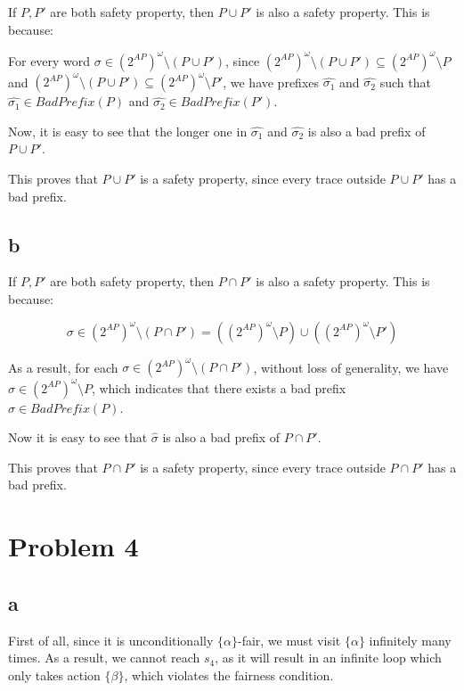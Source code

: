 If $P, P'$ are both safety property, then $P \cup P'$ is also a safety property.
This is because:

\newcommand{\bad}[1]{\textit{BadPrefix}(#1)}
\newcommand{\whole}{(2^{AP})^\omega}

For every word $\sigma \in \whole \setminus (P \cup P')$,
since $\whole \setminus (P \cup P') \subseteq \whole \setminus P$
and $\whole \setminus (P \cup P') \subseteq \whole \setminus P'$,
we have prefixes $\hat{\sigma_1}$ and $\hat{\sigma_2}$ such that
$\hat{\sigma_1} \in \bad{P}$ and $\hat{\sigma_2} \in \bad{P'}$.

Now, it is easy to see that the longer one in $\hat{\sigma_1}$ and
$\hat{\sigma_2}$ is also a bad prefix of $P \cup P'$.

This proves that $P \cup P'$ is a safety property,
since every trace outside $P \cup P'$ has a bad prefix.

\subsection{b}

If $P, P'$ are both safety property, then $P \cap P'$ is also a safety property.
This is because:

$$
\sigma \in \whole \setminus (P \cap P')
= (\whole \setminus P) \cup (\whole \setminus P')
$$

As a result, for each $\sigma \in \whole \setminus (P \cap P')$,
without loss of generality, we have $\sigma \in \whole \setminus P$,
which indicates that there exists a bad prefix $\hat{\sigma} \in \bad{P}$.

Now it is easy to see that $\hat{\sigma}$ is also a bad prefix of $P \cap P'$.

This proves that $P \cap P'$ is a safety property,
since every trace outside $P \cap P'$ has a bad prefix.

\section{Problem 4}

\subsection{a}

\newcommand{\aaa}{\{\alpha\}}
\newcommand{\bb}{\{\beta\}}
\newcommand{\ee}{\{\eta\}}
\newcommand{\Act}{\textit{Act}}

First of all, since it is unconditionally $\aaa$-fair, we must visit $\aaa$ infinitely many times.
As a result, we cannot reach $s_4$, as it will result in an infinite loop which only takes action
$\bb$, which violates the fairness condition.

